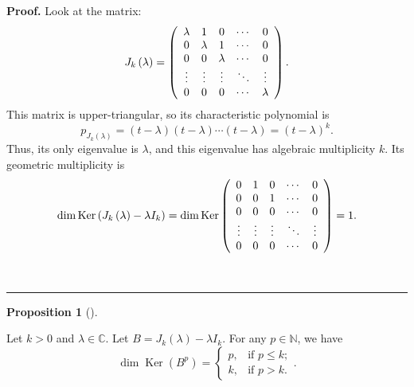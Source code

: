\documentclass[numbers=enddot,12pt,final,onecolumn,notitlepage]{scrartcl}%
\numberwithin{exer}{subsection}
\theoremstyle{definition}
\newtheorem{prop}[theo]{Proposition}
\newenvironment{proposition}[1][]
{\begin{prop}[#1]\begin{leftbar}}
{\end{leftbar}\end{prop}}
\newenvironment{proof}[1][Proof]{\noindent\textbf{#1.} }{\ \rule{0.5em}{0.5em}}
\begin{document}
\begin{proof}
Look at the matrix:%
\[
J_{k}\left(  \lambda\right)  =\left(
\begin{array}
[c]{ccccc}%
\lambda & 1 & 0 & \cdots & 0\\
0 & \lambda & 1 & \cdots & 0\\
0 & 0 & \lambda & \cdots & 0\\
\vdots & \vdots & \vdots & \ddots & \vdots\\
0 & 0 & 0 & \cdots & \lambda
\end{array}
\right)  .
\]
This matrix is upper-triangular, so its characteristic polynomial is%
\[
p_{J_{k}\left(  \lambda\right)  }=\left(  t-\lambda\right)  \left(
t-\lambda\right)  \cdots\left(  t-\lambda\right)  =\left(  t-\lambda\right)
^{k}.
\]
Thus, its only eigenvalue is $\lambda$, and this eigenvalue has algebraic
multiplicity $k$. Its geometric multiplicity is%
\[
\dim\operatorname*{Ker}\left(  J_{k}\left(  \lambda\right)  -\lambda
I_{k}\right)  =\dim\operatorname*{Ker}\left(
\begin{array}
[c]{ccccc}%
0 & 1 & 0 & \cdots & 0\\
0 & 0 & 1 & \cdots & 0\\
0 & 0 & 0 & \cdots & 0\\
\vdots & \vdots & \vdots & \ddots & \vdots\\
0 & 0 & 0 & \cdots & 0
\end{array}
\right)  =1.
\]

\end{proof}

\begin{proposition}
Let $k>0$ and $\lambda\in\mathbb{C}$. Let $B=J_{k}\left(  \lambda\right)
-\lambda I_{k}$. For any $p\in\mathbb{N}$, we have%
\[
\dim\operatorname*{Ker}\left(  B^{p}\right)  =%
\begin{cases}
p, & \text{if }p\leq k;\\
k, & \text{if }p>k.
\end{cases}
.
\]

\end{proposition}
\end{document}
